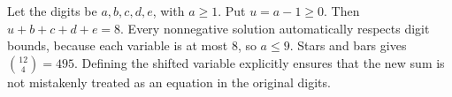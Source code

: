 Let the digits be $a,b,c,d,e$, with $a\ge1$. Put $u=a-1\ge0$. Then $u+b+c+d+e=8$. Every nonnegative solution automatically respects digit bounds, because each variable is at most $8$, so $a\le9$. Stars and bars gives $\boxed{\binom{12}4=495}$. Defining the shifted variable explicitly ensures that the new sum is not mistakenly treated as an equation in the original digits.
